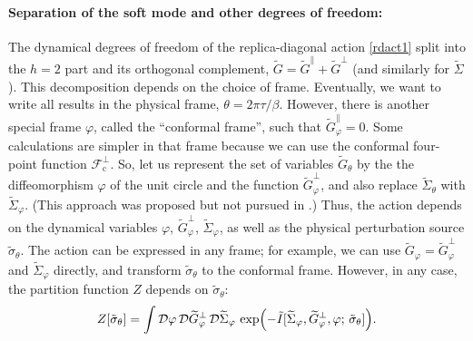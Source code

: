 \documentclass[12pt]{article}
\newcommand{\calD}{\mathcal{D}}
\newcommand{\calF}{\mathcal{F}}
\newcommand{\cc}{\mathrm{c}}
\newcommand{\tI}{\tilde{I}}
\newcommand{\tG}{\widetilde{G}}
\newcommand{\tSig}{\widetilde{\Sigma}}
\newcommand{\tsig}{\tilde{\sigma}}
\newcommand{\vp}{\varphi}
\begin{document}
\paragraph{Separation of the soft mode and other degrees of freedom:}
The dynamical degrees of freedom of the replica-diagonal action \eqref{rdact1} split into the $h=2$ part and its orthogonal complement, $\tG=\tG^{\parallel}+\tG^{\perp}$ (and similarly for $\tSig$). This decomposition depends on the choice of frame. Eventually, we want to write all results in the physical frame, $\theta=2\pi\tau/\beta$. However, there is another special frame $\vp$, called the ``conformal frame'', such that $\tG_{\vp}^{\parallel}=0$. Some calculations are simpler in that frame because we can use the conformal four-point function $\calF^{\perp}_{\cc}$. So, let us represent the set of variables $\tG_{\theta}$ by the the diffeomorphism $\vp$ of the unit circle and the function $\tG_{\vp}^{\perp}$, and also replace $\tSig_{\theta}$ with $\tSig_{\vp}$. (This approach was proposed but not pursued in \cite{JeSuYo16}.) Thus, the action depends on the dynamical variables $\vp$, $\tG_{\vp}^{\perp}$, $\tSig_{\vp}$, as well as the physical perturbation source $\tsig_{\theta}$. The action can be expressed in any frame; for example, we can use $\tG_{\vp}=\tG_{\vp}^{\perp}$ and $\tSig_{\vp}$ directly, and transform $\tsig_{\theta}$ to the conformal frame. However, in any case, the partition function $Z$ depends on $\tsig_{\theta}$:
\begin{equation} \label{fullZ}
Z[\tsig_{\theta}]=\int \calD\vp\,\calD\tG_{\vp}^{\perp}\,\calD\tSig_{\vp}\, \exp\Bigl(-\tI[\tSig_{\vp},\tG_{\vp}^{\perp},\vp;\,\tsig_{\theta}]\Bigr).
\end{equation}
\end{document}
